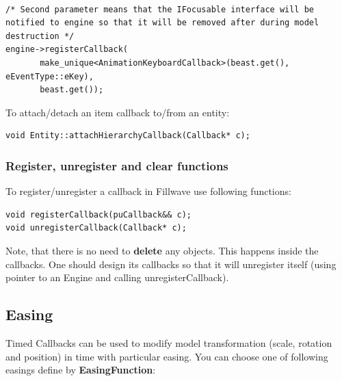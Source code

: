 \documentclass{article}
\begin{document}
\begin{lstlisting}

/* Second parameter means that the IFocusable interface will be notified to engine so that it will be removed after during model destruction */
engine->registerCallback(
	   make_unique<AnimationKeyboardCallback>(beast.get(), eEventType::eKey),
	   beast.get());

\end{lstlisting}
   
\indent \indent To attach/detach an item callback to/from an entity:

\begin{lstlisting}
void Entity::attachHierarchyCallback(Callback* c);
\end{lstlisting}

\subsubsection{Register, unregister and clear functions}\label{sec:register functions}
\indent \indent To register/unregister a callback in Fillwave use following functions:

\begin{lstlisting}
void registerCallback(puCallback&& c);
void unregisterCallback(Callback* c);
\end{lstlisting}

\indent \indent Note, that there is no need to \textbf{delete} any objects. This happens inside the callbacks. One should design its callbacks so that it will unregister itself (using pointer to an Engine and calling unregisterCallback).

\newpage

\subsection{Easing}\label{sec:Easing}

\indent \indent Timed Callbacks can be used to modify model transformation (scale, rotation and position) in time with particular easing. You can choose one of following easings define by \textbf{EasingFunction}:
\end{document}
